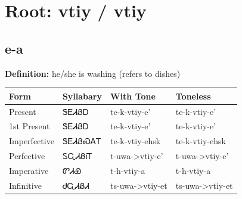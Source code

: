 \documentclass{article}%
\begin{document}
%
\normalsize%
\section*{Root: vtiy / vtiy}%
\subsection*{e-a}%
\textbf{Definition: }%
he/she is washing (refers to dishes)%
\\[0.5em]%
\begin{tabular}{|l|l|l|l|}%
\hline%
\textbf{Form}&\textbf{Syllabary}&\textbf{With Tone}&\textbf{Toneless}\\%
\hline%
Present&ᏕᎬᏗᏰᎠ&te{-}k{-}vtiy{-}e'&te{-}k{-}vtiy{-}e'\\%
1st Present&ᏕᎬᏗᏰᎠ&te{-}k{-}vtiy{-}e'&te{-}k{-}vtiy{-}e'\\%
Imperfective&ᏕᎬᏗᏰᏍᎪᎢ&te{-}k{-}vtiy{-}ehsk&te{-}k{-}vtiy{-}ehsk\\%
Perfective&ᏚᏩᏗᏰᎥᎢ&t{-}uwa{-}>vtiy{-}e'&t{-}uwa{-}>vtiy{-}e'\\%
Imperative&ᏛᏗᏯ&t{-}h{-}vtiy{-}a&t{-}h{-}vtiy{-}a\\%
Infinitive&ᏧᏩᏗᏰᏗ&ts{-}uwa{-}>vtiy{-}et&ts{-}uwa{-}>vtiy{-}et\\%
\hline%
\end{tabular}%
\\[1em]%
\end{document}
